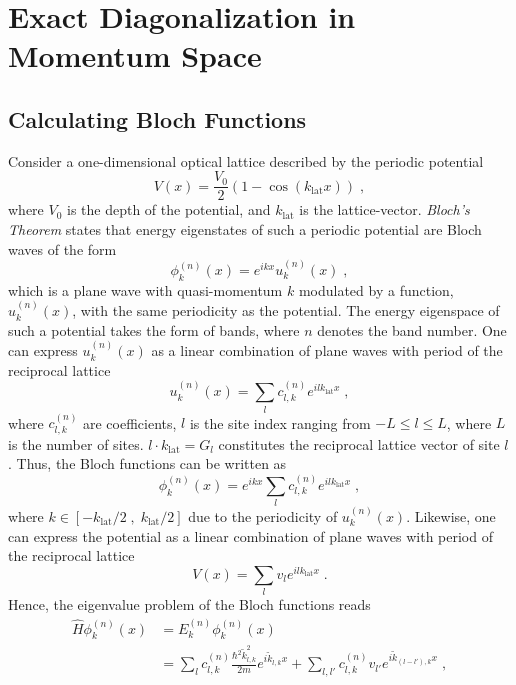 \chapter{Exact Diagonalization in Momentum Space}

\section{Calculating Bloch Functions}
Consider a one-dimensional optical lattice described by the periodic potential
\begin{equation}
	V(x) = \frac{V_0}{2} \left( 1 - \cos (k_{\mathrm{lat}} x)  \right) \; , \label{eq:pot}
\end{equation}
where $V_0$ is the depth of the potential, and $k_{\mathrm{lat}}$ is the lattice-vector. \textit{Bloch's Theorem} states that energy eigenstates of such a periodic potential are Bloch waves of the form
\begin{equation}
	\phi_{k}^{(n)}(x) = e^{i k x} u_{k}^{(n)}(x) \; ,
\end{equation}
which is a plane wave with quasi-momentum $k$ modulated by a function, $u_{k}^{(n)}(x)$, with the same periodicity as the potential. The energy eigenspace of such a potential takes the form of bands, where $n$ denotes the band number.
One can express $u_{k}^{(n)}(x)$ as a linear combination of plane waves with period of the reciprocal lattice
\begin{equation}
	u_{k}^{(n)}(x) = \sum_{l} c_{l,k}^{(n)} e^{i l k_{\mathrm{lat}} x} \; ,
\end{equation}
where $c_{l,k}^{(n)}$ are coefficients, $l$ is the site index ranging from $-L \leq l \leq L$, where $L$ is the number of sites. $l \cdot k_{\mathrm{lat}} = G_l$ constitutes the reciprocal lattice vector of site $l$. Thus, the Bloch functions can be written as
\begin{equation}
	\phi_{k}^{(n)}(x) = e^{i k x} \sum_{l} c_{l,k}^{(n)} e^{i l k_{\mathrm{lat}} x} \; ,
\end{equation}
where $k \in [-k_{\mathrm{lat}}/2 \; , \; k_{\mathrm{lat}}/2]$ due to the periodicity of $u_{k}^{(n)}(x)$.
Likewise, one can express the potential as a linear combination of plane waves with period of the reciprocal lattice
\begin{equation}
	V(x) = \sum_{l} v_{l} e^{i l k_{\mathrm{lat}} x} \; . \label{eq:potfourier}
\end{equation}
Hence, the eigenvalue problem of the Bloch functions reads
\begin{align}
	\hat{H} \phi_{k}^{(n)}(x) &= E_{k}^{(n)} \phi_{k}^{(n)}(x) \nonumber \\
	&= \sum_l c_{l,k}^{(n)} \frac{\hbar^2 \tilde{k}_{l,k}^2}{2 m} e^{i \tilde{k}_{l,k} x} + \sum_{l,l'} c_{l,k}^{(n)} v_{l'} e^{i \tilde{k}_{(l-l'),k} x} \; ,
\end{align}

